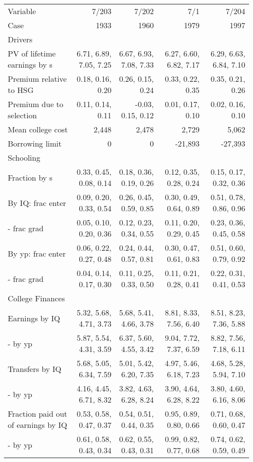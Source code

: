 \begin{tabular}{lrrrr}
\hline
Variable & 7/203  & 7/202  & 7/1  & 7/204  \\ 
Case & 1933  & 1960  & 1979  & 1997  \\ 
Drivers &   &   &   &   \\ 
PV of lifetime earnings by s & 6.71, 6.89, 7.05, 7.25  & 6.67, 6.93, 7.08, 7.33  & 6.27, 6.60, 6.82, 7.17  & 6.29, 6.63, 6.84, 7.10  \\ 
Premium relative to HSG & 0.18, 0.16, 0.20  & 0.26, 0.15, 0.24  & 0.33, 0.22, 0.35  & 0.35, 0.21, 0.26  \\ 
Premium due to selection & 0.11, 0.14, 0.11  & -0.03, 0.15, 0.12  & 0.01, 0.17, 0.10  & 0.02, 0.16, 0.10  \\ 
Mean college cost & 2,448  & 2,478  & 2,729  & 5,062  \\ 
Borrowing limit & 0  & 0  & -21,893  & -27,393  \\ 
\hline
Schooling &   &   &   &   \\ 
Fraction by s & 0.33, 0.45, 0.08, 0.14  & 0.18, 0.36, 0.19, 0.26  & 0.12, 0.35, 0.28, 0.24  & 0.15, 0.17, 0.32, 0.36  \\ 
By IQ: frac enter & 0.09, 0.20, 0.33, 0.54  & 0.26, 0.45, 0.59, 0.85  & 0.30, 0.49, 0.64, 0.89  & 0.51, 0.78, 0.86, 0.96  \\ 
- frac grad & 0.05, 0.10, 0.20, 0.36  & 0.12, 0.23, 0.34, 0.55  & 0.11, 0.20, 0.29, 0.45  & 0.23, 0.36, 0.45, 0.58  \\ 
By yp: frac enter & 0.06, 0.22, 0.27, 0.48  & 0.24, 0.44, 0.57, 0.81  & 0.30, 0.47, 0.61, 0.83  & 0.51, 0.60, 0.79, 0.92  \\ 
- frac grad & 0.04, 0.14, 0.17, 0.30  & 0.11, 0.25, 0.33, 0.50  & 0.11, 0.21, 0.28, 0.41  & 0.22, 0.31, 0.41, 0.53  \\ 
\hline
College Finances &   &   &   &   \\ 
Earnings by IQ & 5.32, 5.68, 4.71, 3.73  & 5.68, 5.41, 4.66, 3.78  & 8.81, 8.33, 7.56, 6.40  & 8.51, 8.23, 7.36, 5.88  \\ 
- by yp & 5.87, 5.54, 4.31, 3.59  & 6.37, 5.60, 4.55, 3.42  & 9.04, 7.72, 7.37, 6.59  & 8.82, 7.56, 7.18, 6.11  \\ 
Transfers by IQ & 5.68, 5.05, 6.34, 7.59  & 5.01, 5.42, 6.20, 7.35  & 4.97, 5.46, 6.18, 7.23  & 4.68, 5.28, 5.94, 7.10  \\ 
- by yp & 4.16, 4.45, 6.71, 8.32  & 3.82, 4.63, 6.28, 8.24  & 3.90, 4.64, 6.28, 8.22  & 3.80, 4.60, 6.16, 8.06  \\ 
Fraction paid out of earnings by IQ & 0.53, 0.58, 0.47, 0.37  & 0.54, 0.51, 0.44, 0.35  & 0.95, 0.89, 0.80, 0.66  & 0.71, 0.68, 0.60, 0.47  \\ 
- by yp & 0.61, 0.58, 0.43, 0.34  & 0.62, 0.55, 0.43, 0.31  & 0.99, 0.82, 0.77, 0.68  & 0.74, 0.62, 0.59, 0.49  \\ 
\hline
\end{tabular}%
